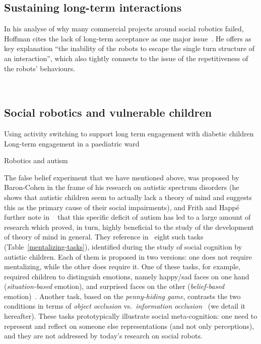 \documentclass[11pt,a4paper]{report}
\begin{document}
\subsection{Sustaining long-term interactions}

In his analyse of why many commercial projects around social robotics failed,
Hoffman cites the lack of long-term acceptance as one major
issue~\cite{hoffman2019anki}. He offers as key explanation ``the inability of
the robots to escape the single turn structure of an interaction'', which also
tightly connects to the issue of the repetitiveness of the robots' behaviours.

~\cite{dereshev2019longterm}

\subsection{Social robotics and vulnerable children}

Using activity switching to support long term engagement with diabetic children~\cite{coninx2016towards}
Long-term engagement in a paediatric ward~\cite{baxter2011long}

Robotics and autism~\cite{pennisi2016autism}

The false belief experiment that we have mentioned above, was proposed by
Baron-Cohen in the frame of his research on autistic spectrum disorders (he
shows that autistic children seem to actually lack a theory of mind and suggests
this as the primary cause of their social impairments), and Frith and Happé
further note in ~\cite{frith1994autism} that this specific deficit of autism has
led to a large amount of research which proved, in turn, highly beneficial to
the study of the development of theory of mind in general. They reference
in~\cite{frith1994autism} eight such tasks (Table~\ref{mentalizing-tasks}),
identified during the study of social cognition by autistic children. Each of
them is proposed in two versions: one does not require mentalizing, while the
other does require it.  One of these tasks, for example, required children to
distinguish emotions, namely happy/sad faces on one hand (\emph{situation-based}
emotion), and surprised faces on the other (\emph{belief-based}
emotion)~\cite{baron1993children}.  Another task, based on the
\emph{penny-hiding game}, contrasts the two conditions in terms of \emph{object
occlusion} vs.~\emph{information occlusion}~\cite{baron1992out} (we detail it
hereafter). These tasks prototypically illustrate social meta-cognition: one
need to represent and reflect on someone else representations (and not only
perceptions), and they are not addressed by today's research on social robots.
\end{document}
